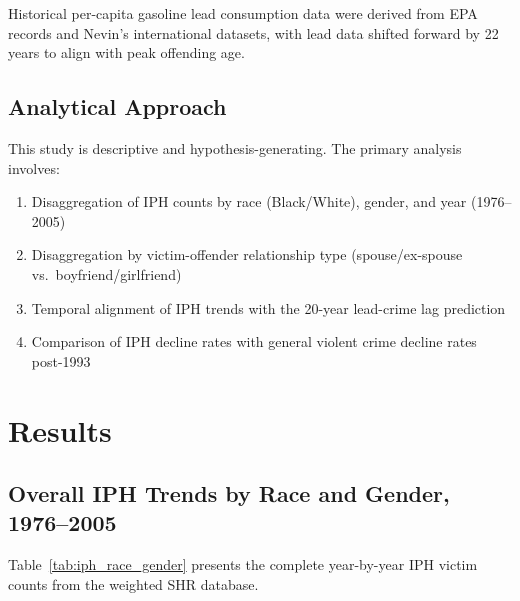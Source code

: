 \documentclass[12pt, letterpaper]{article}
\begin{document}
Historical per-capita gasoline lead consumption data were derived from EPA records and Nevin's \citeyearpar{nevin2007} international datasets, with lead data shifted forward by 22 years to align with peak offending age.

\subsection{Analytical Approach}

This study is descriptive and hypothesis-generating. The primary analysis involves:
\begin{enumerate}[nosep]
    \item Disaggregation of IPH counts by race (Black/White), gender, and year (1976--2005)
    \item Disaggregation by victim-offender relationship type (spouse/ex-spouse vs.\ boyfriend/girlfriend)
    \item Temporal alignment of IPH trends with the 20-year lead-crime lag prediction
    \item Comparison of IPH decline rates with general violent crime decline rates post-1993
\end{enumerate}

\section{Results}

\subsection{Overall IPH Trends by Race and Gender, 1976--2005}

Table~\ref{tab:iph_race_gender} presents the complete year-by-year IPH victim counts from the weighted SHR database.
\end{document}

